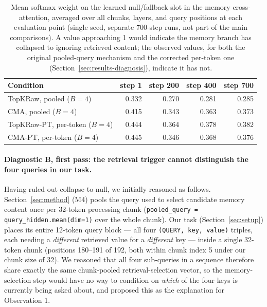 \documentclass[11pt]{article}
\begin{document}
\begin{table}[H]
\centering
\small
\begin{tabular}{lrrrr}
\toprule
Condition & step 1 & step 200 & step 400 & step 700 \\
\midrule
TopKRaw, pooled ($B{=}4$) & 0.332 & 0.270 & 0.281 & 0.285 \\
CMA, pooled ($B{=}4$) & 0.415 & 0.343 & 0.363 & 0.373 \\
TopKRaw-PT, per-token ($B{=}4$) & 0.444 & 0.364 & 0.378 & 0.382 \\
CMA-PT, per-token ($B{=}4$) & 0.445 & 0.346 & 0.368 & 0.376 \\
\bottomrule
\end{tabular}
\caption{Mean softmax weight on the learned null/fallback slot in the memory cross-attention,
averaged over all chunks, layers, and query positions at each evaluation point (single seed,
separate 700-step runs, not part of the main comparisons). A value approaching 1 would indicate
the memory branch has collapsed to ignoring retrieved content; the observed values, for both the
original pooled-query mechanism and the corrected per-token one (Section~\ref{sec:results-diagnosis}),
indicate it has not.}
\label{tab:null-attn}
\end{table}

\paragraph{Diagnostic B, first pass: the retrieval trigger cannot distinguish the four queries in
our task.} Having ruled out collapse-to-null, we initially reasoned as follows. Section~\ref{sec:method}
(M4) pools the query used to select candidate memory content once per 32-token processing chunk
(\texttt{pooled\_query = query\_hidden.mean(dim=1)} over the whole chunk). Our task
(Section~\ref{sec:setup}) places its entire 12-token query block --- all four
\texttt{(QUERY, key, value)} triples, each needing a \emph{different} retrieved value for a
\emph{different} key --- inside a single 32-token chunk (positions 180--191 of 192, both within
chunk index 5 under our chunk size of 32). We reasoned that all four sub-queries in a sequence
therefore share exactly the same chunk-pooled retrieval-selection vector, so the memory-selection
step would have no way to condition on \emph{which} of the four keys is currently being asked
about, and proposed this as the explanation for Observation 1.
\end{document}
